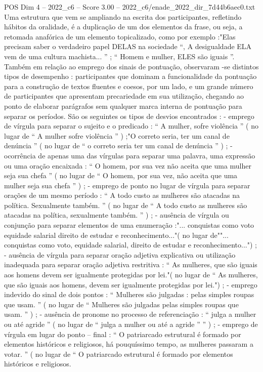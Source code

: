 \begin{textsample}{POS Dim 4 – 2022\_c6 – Score 3.00 – 2022\_c6/enade\_2022\_dir\_7d44b6aec0.txt}
Uma estrutura que vem se ampliando na escrita dos participantes, refletindo hábitos da oralidade, é a duplicação de um dos elementos da frase, ou seja, a retomada anafórica de um elemento topicalizado, como por exemplo :"Elas precisam saber o verdadeiro papel DELAS na sociedade “, A desigualdade ELA vem de uma cultura machista... ” ; “ Homem e mulher, ELES são iguais ”.
Também em relação ao emprego dos sinais de pontuação, observaram -se distintos tipos de desempenho : participantes que dominam a funcionalidade da pontuação para a construção de textos fluentes e coesos, por um lado, e um grande número de participantes que apresentam precariedade em sua utilização, chegando ao ponto de elaborar parágrafos sem qualquer marca interna de pontuação para separar os períodos.
São os seguintes os tipos de desvios encontrados : - emprego de vírgula para separar o sujeito e o predicado : “ A mulher, sofre violência ” ( no lugar de “ A mulher sofre violência ” ) ;"O correto seria, ter um canal de denúncia ” ( no lugar de “ o correto seria ter um canal de denúncia ” ) ; - ocorrência de apenas uma das vírgulas para separar uma palavra, uma expressão ou uma oração encaixada : “ O homem, por sua vez não aceita que uma mulher seja sua chefa ” ( no lugar de “ O homem, por sua vez, não aceita que uma mulher seja sua chefa ” ) ; - emprego de ponto no lugar de vírgula para separar orações de um mesmo período : “ A todo custo as mulheres são atacadas na política.
Sexualmente também. ” ( no lugar de “ A todo custo as mulheres são atacadas na política, sexualmente também. ” ) ; - ausência de vírgula ou conjunção para separar elementos de uma enumeração :"... conquistas como voto equidade salarial direito de estudar e reconhecimento..."( no lugar de""... conquistas como voto, equidade salarial, direito de estudar e reconhecimento...") ; - ausência de vírgula para separar oração adjetiva explicativa ou utilização inadequada para separar oração adjetiva restritiva : “ As mulheres, que são iguais aos homens devem ser igualmente protegidas por lei."( no lugar de “ As mulheres, que são iguais aos homens, devem ser igualmente protegidas por lei.") ; - emprego indevido do sinal de dois pontos : “ Mulheres são julgadas : pelas simples roupas que usam. ” ( no lugar de “ Mulheres são julgadas pelas simples roupas que usam. ” ) ; - ausência de pronome no processo de referenciação : “ julga a mulher ou até agride ” ( no lugar de “ julga a mulher ou até a agride ” ” ) ; - emprego de vírgula em lugar do ponto – final : “ O patriarcado estrutural é formado por elementos históricos e religiosos, há pouquíssimo tempo, as mulheres passaram a votar. ” ( no lugar de “ O patriarcado estrutural é formado por elementos históricos e religiosos.

\end{textsample}
